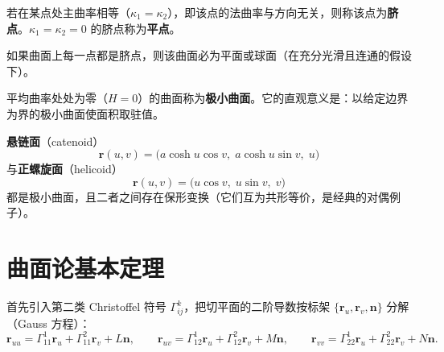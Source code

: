 \begin{definition}[脐点]
	若在某点处主曲率相等（$\kappa_1=\kappa_2$），即该点的法曲率与方向无关，则称该点为\textbf{脐点}。$\kappa_1=\kappa_2=0$ 的脐点称为\textbf{平点}。
\end{definition}

\begin{theorem}[全脐点曲面]
	如果曲面上每一点都是脐点，则该曲面必为平面或球面（在充分光滑且连通的假设下）。
	\label{thm:全脐点曲面}
\end{theorem}

\begin{definition}[极小曲面]
	平均曲率处处为零（$H=0$）的曲面称为\textbf{极小曲面}。它的直观意义是：以给定边界为界的极小曲面使面积取驻值。
\end{definition}

\begin{example}[悬链面与正螺旋面]
	\textbf{悬链面}（catenoid）
	\begin{equation}
		\boldsymbol{r}(u,v)=\bigl(a\cosh u\cos v,\;a\cosh u\sin v,\;u\bigr)
		\label{eq:悬链面:参数表示}
	\end{equation}
	与\textbf{正螺旋面}（helicoid）
	\begin{equation}
		\boldsymbol{r}(u,v)=\bigl(u\cos v,\;u\sin v,\;v\bigr)
		\label{eq:正螺旋面:参数表示}
	\end{equation}
	都是极小曲面，且二者之间存在保形变换（它们互为共形等价，是经典的对偶例子）。
\end{example}

\section{曲面论基本定理}

首先引入第二类 Christoffel 符号 $\Gamma_{ij}^{k}$，把切平面的二阶导数按标架 $\{\boldsymbol{r}_u,\boldsymbol{r}_v,\mathbf{n}\}$ 分解（Gauss 方程）：
\begin{equation}
	\boldsymbol{r}_{uu}=\Gamma_{11}^{1}\boldsymbol{r}_u+\Gamma_{11}^{2}\boldsymbol{r}_v+L\mathbf{n},
	\qquad
	\boldsymbol{r}_{uv}=\Gamma_{12}^{1}\boldsymbol{r}_u+\Gamma_{12}^{2}\boldsymbol{r}_v+M\mathbf{n},
	\qquad
	\boldsymbol{r}_{vv}=\Gamma_{22}^{1}\boldsymbol{r}_u+\Gamma_{22}^{2}\boldsymbol{r}_v+N\mathbf{n}.
	\label{eq:Gauss方程:分解}
\end{equation}

